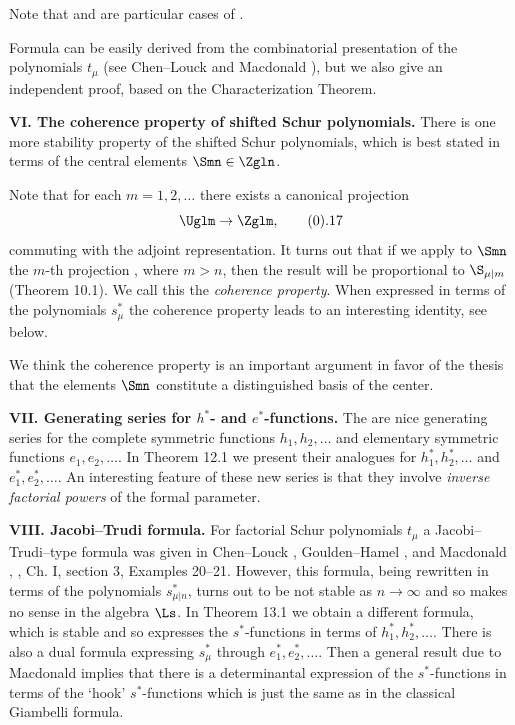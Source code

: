 Note that  and  are particular cases of .

Formula  can be easily derived from the combinatorial
presentation of the polynomials $t_\mu$ (see Chen--Louck \cite{CL} and
Macdonald \cite{M2}), but we also give an independent proof, based
on the Characterization Theorem.

{\bf VI. The coherence property of shifted Schur polynomials.} There is
one more stability property of the shifted Schur polynomials, which is
best stated in terms of the central elements $\Smn\in\Zgln$.

Note that for each $m=1,2,\ldots$ there exists a canonical projection
$$
\Uglm\to\Zglm,\tag0.17
$$
commuting with the adjoint representation. It turns out that if we apply
to $\Smn$ the $m$-th projection , where $m>n$, then the result
will be proportional to $\S_{\mu|m}$ (Theorem 10.1). We call this the {\it
coherence property\/}. When expressed in terms of the polynomials $s^*_\mu$
the coherence property leads to an interesting identity, see  
below.

We think the coherence property is an important argument in favor of the
thesis that the elements $\Smn$ constitute a distinguished basis of the
center. 

{\bf VII. Generating series for $h^*$- and $e^*$-functions.} The are nice
generating series for the complete symmetric functions $h_1,h_2,\ldots$
and elementary symmetric functions $e_1,e_2,\ldots$. In Theorem 12.1 we
present their analogues for $h^*_1,h^*_2,\ldots$ and $e^*_1,e^*_2,\ldots$.
An interesting feature of these new series is that they involve 
{\it inverse factorial powers\/} of the formal parameter.

{\bf VIII. Jacobi--Trudi formula.} For factorial Schur polynomials $t_\mu$
a Jacobi--Trudi--type formula was given in  Chen--Louck
\cite{CL}, Goulden--Hamel \cite{GH}, and Macdonald \cite{M2}, \cite{M1},
Ch. I, section 3, Examples 20--21.
However, this formula, being rewritten in terms of the polynomials
$s^*_{\mu|n}$, turns out to be not stable as $n\to\infty$ and so makes no
sense in the algebra $\Ls$. In Theorem 13.1
we obtain a different formula, which is stable and so expresses the
$s^*$-functions in terms of $h^*_1,h^*_2,\ldots$. There is also a dual
formula expressing $s^*_\mu$ through $e^*_1,e^*_2,\ldots$. Then a general
result due to Macdonald implies that there is a determinantal expression
of the $s^*$-functions in terms of the `hook' $s^*$-functions which is
just the same as in the classical Giambelli formula.

